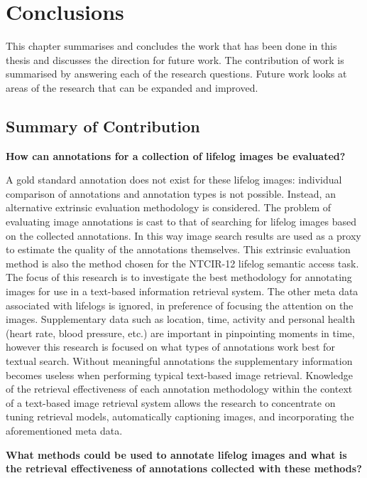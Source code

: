 \chapter{Conclusions}

This chapter summarises and concludes the work that has been done in this thesis and discusses the direction for future work. The contribution of work is summarised by answering each of the research questions. Future work looks at areas of the research that can be expanded and improved.

\section{Summary of Contribution}

\textbf{How can annotations for a collection of lifelog images be evaluated?}

A gold standard annotation does not exist for these lifelog images: individual comparison of annotations and annotation types is not possible. Instead, an alternative extrinsic evaluation methodology is considered. The problem of evaluating image annotations is cast to that of searching for lifelog images based on the collected annotations. In this way image search results are used as a proxy to estimate the quality of the annotations themselves. This extrinsic evaluation method is also the method chosen for the NTCIR-12 lifelog semantic access task. The focus of this research is to investigate the best methodology for annotating images for use in a text-based information retrieval system. The other meta data associated with lifelogs is ignored, in preference of focusing the attention on the images. Supplementary data such as location, time, activity and personal health (heart rate, blood pressure, etc.) are important in pinpointing moments in time, however this research is focused on what types of annotations work best for textual search. Without meaningful annotations the supplementary information becomes useless when performing typical text-based image retrieval. Knowledge of the retrieval effectiveness of each annotation methodology within the context of a text-based image retrieval system allows the research to concentrate on tuning retrieval models, automatically captioning images, and incorporating the aforementioned meta data. 

\textbf{What methods could be used to annotate lifelog images and what is the retrieval effectiveness of annotations collected with these methods?}

